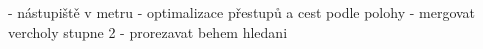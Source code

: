 - nástupiště v metru - optimalizace přestupů a cest podle polohy
- mergovat vercholy stupne 2
- prorezavat behem hledani

